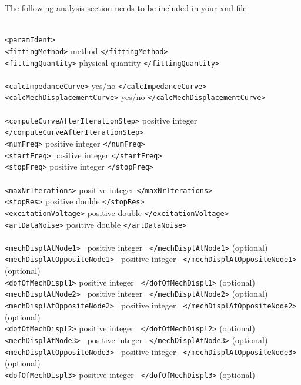 The following analysis section needs to be included in your xml-file:
\begin{center}
\begin{minipage}{0.6\textwidth}
\begin{tabbing}
\quad\=\\ \kill
\verb!<paramIdent>!\\

\> \verb!<fittingMethod>! method \verb!</fittingMethod>!\\
\> \verb!<fittingQuantity>! physical quantity \verb!</fittingQuantity>!\\ \\

\> \verb!<calcImpedanceCurve>! yes/no \verb!</calcImpedanceCurve>!\\
\> \verb!<calcMechDisplacementCurve>! yes/no \verb!</calcMechDisplacementCurve>!\\ \\

\> \verb!<computeCurveAfterIterationStep>! positive integer \verb!</computeCurveAfterIterationStep>!\\
\> \verb!<numFreq>! positive integer \verb!</numFreq>! \\
\> \verb!<startFreq>! positive integer \verb!</startFreq>! \\
\> \verb!<stopFreq>! positive integer \verb!</stopFreq>! \\ \\

\> \verb!<maxNrIterations>! positive integer \verb!</maxNrIterations>! \\
\> \verb!<stopRes>! positive double \verb!</stopRes>! \\
\> \verb!<excitationVoltage>! positive double \verb!</excitationVoltage>! \\
\> \verb!<artDataNoise>! positive double \verb!</artDataNoise>! \\ \\

\> \verb!<mechDisplAtNode1> ! positive integer \verb! </mechDisplAtNode1>! (optional)\\
\> \verb!<mechDisplAtOppositeNode1> ! positive integer \verb! </mechDisplAtOppositeNode1>! (optional)\\
\> \verb!<dofOfMechDispl1>! positive integer \verb! </dofOfMechDispl1>! (optional) \\
\> \verb!<mechDisplAtNode2> ! positive integer \verb! </mechDisplAtNode2>! (optional)\\
\> \verb!<mechDisplAtOppositeNode2> ! positive integer \verb! </mechDisplAtOppositeNode2>! (optional)\\
\> \verb!<dofOfMechDispl2>! positive integer \verb! </dofOfMechDispl2>! (optional)\\ 
\> \verb!<mechDisplAtNode3> ! positive integer \verb! </mechDisplAtNode3>! (optional)\\
\> \verb!<mechDisplAtOppositeNode3> ! positive integer \verb! </mechDisplAtOppositeNode3>! (optional)\\
\> \verb!<dofOfMechDispl3>! positive integer \verb! </dofOfMechDispl3>! (optional)\\ 


\end{tabbing}
\end{minipage}
\end{center}
